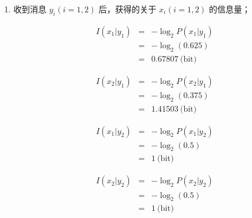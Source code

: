 \documentclass[onecolumn,oneside]{BUPTHomework}
\begin{document}
\begin{solution}
{\begin{enumerate}
      \begin{eqnarray} 
        P(x_1 \vert y_2) &=& \frac{P(x_1)P(y_2 \vert x_1)}{\sum_{j=1}^2P(x_j)P(y_2 \vert x_j)} \nonumber \\
        &=& \frac{0.6 \times \frac{1}{6}}{0.6 \times \frac{1}{6} + 0.4 \times \frac{1}{4}} \nonumber \\
        &=& 0.5 \nonumber
      \end{eqnarray}

      \begin{eqnarray} 
        P(x_2 \vert y_2) &=& \frac{P(x_2)P(y_2 \vert x_2)}{\sum_{j=1}^2P(x_j)P(y_2 \vert x_j)} \nonumber \\
        &=& \frac{0.4 \times \frac{1}{4}}{0.6 \times \frac{1}{6} + 0.4 \times \frac{1}{4}} \nonumber \\
        &=& 0.5 \nonumber
      \end{eqnarray}
      
      \item 收到消息 $y_i(i=1,2)$ 后，获得的关于 $x_i(i=1,2)$ 的信息量；
      
      \begin{eqnarray} 
        I(x_1 \vert y_1) &=& -\log_2P(x_1 \vert y_1) \nonumber \\
        &=& -\log_2(0.625) \nonumber \\
        &=& 0.67807\ \mbox{(bit)} \nonumber
      \end{eqnarray}
      
      \begin{eqnarray} 
        I(x_2 \vert y_1) &=& -\log_2P(x_2 \vert y_1) \nonumber \\
        &=& -\log_2(0.375) \nonumber \\
        &=& 1.41503\ \mbox{(bit)} \nonumber
      \end{eqnarray}

      \begin{eqnarray} 
        I(x_1 \vert y_2) &=& -\log_2P(x_1 \vert y_2) \nonumber \\
        &=& -\log_2(0.5) \nonumber \\
        &=& 1\ \mbox{(bit)} \nonumber
      \end{eqnarray}

      \begin{eqnarray} 
        I(x_2 \vert y_2) &=& -\log_2P(x_2 \vert y_2) \nonumber \\
        &=& -\log_2(0.5) \nonumber \\
        &=& 1\ \mbox{(bit)} \nonumber
      \end{eqnarray}


\end{enumerate}}
\end{solution}
\end{document}

